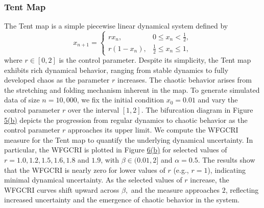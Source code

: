 \documentclass[12pt,a4paper]{article}
\numberwithin{equation}{section}
\begin{document}
\subsubsection*{Tent Map}
The Tent map is a simple piecewise linear dynamical system defined by $$x_{n+1} =
\begin{cases}
	r x_n, & 0 \le x_n < \tfrac{1}{2}, \\
	r (1 - x_n), & \tfrac{1}{2} \le x_n \le 1,
\end{cases}$$
where \( r \in [0,2] \) is the control parameter. Despite its simplicity, the Tent map exhibits rich dynamical behavior, ranging from stable dynamics to fully developed chaos as the parameter \( r \) increases. The chaotic behavior arises from the stretching and folding mechanism inherent in the map.
To generate simulated data of size \( n = 10{,}000 \), we fix the initial condition \( x_0 = 0.01 \) and vary the control parameter \( r \) over the interval \( [1,2] \). The bifurcation diagram in Figure \hyperref[fig4]{5(b)} depicts the progression from regular dynamics to chaotic behavior as the control parameter $r$ approaches its upper limit.
We compute the WFGCRI measure for the Tent map to quantify the underlying dynamical uncertainty. In particular, the WFGCRI is plotted in Figure \hyperref[fig5]{6(b)} for selected values of $r = 1.0, 1.2, 1.5, 1.6, 1.8$ and $1.9$, with $\beta \in (0.01,2]$ and $\alpha = 0.5$.
The results show that the WFGCRI is nearly zero for lower values of $r$ (e.g., $r=1$), indicating minimal dynamical uncertainty. As the selected values of $r$ increase, the WFGCRI curves shift upward across $\beta,$ and the measure approaches $2$, reflecting increased uncertainty and the emergence of chaotic behavior in the system.
\end{document}
